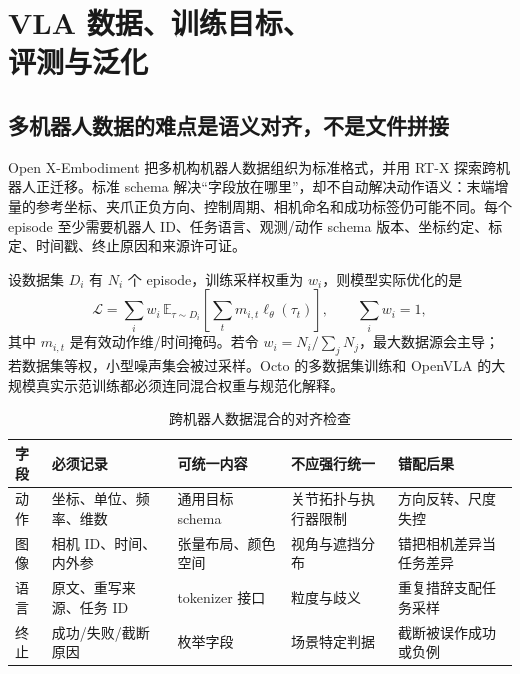 \chapter[VLA 数据、训练目标、评测与泛化]{VLA 数据、训练目标、\\评测与泛化}
\label{chap:vla-data-evaluation}

\section{多机器人数据的难点是语义对齐，不是文件拼接}

Open X-Embodiment 把多机构机器人数据组织为标准格式，并用 RT-X 探索跨机器人正迁移\cite{openx2024}。标准 schema 解决“字段放在哪里”，却不自动解决动作语义：末端增量的参考坐标、夹爪正负方向、控制周期、相机命名和成功标签仍可能不同。每个 episode 至少需要机器人 ID、任务语言、观测/动作 schema 版本、坐标约定、标定、时间戳、终止原因和来源许可证。

设数据集 $D_i$ 有 $N_i$ 个 episode，训练采样权重为 $w_i$，则模型实际优化的是
\begin{equation}
\mathcal L=\sum_i w_i\,\mathbb E_{\tau\sim D_i}
\left[\sum_t m_{i,t}\ell_\theta(\tau_t)\right],\qquad \sum_iw_i=1,
\label{eq:vla-mixture-loss}
\end{equation}
其中 $m_{i,t}$ 是有效动作维/时间掩码。若令 $w_i=N_i/\sum_jN_j$，最大数据源会主导；若数据集等权，小型噪声集会被过采样。Octo 的多数据集训练\cite{octo2024}和 OpenVLA 的大规模真实示范训练\cite{kim2024openvla}都必须连同混合权重与规范化解释。

\begin{table}[H]
\centering
\caption{跨机器人数据混合的对齐检查}
\label{tab:vla-data-alignment}
\begin{tabularx}{\textwidth}{p{}YYYY}
\toprule
字段 & 必须记录 & 可统一内容 & 不应强行统一 & 错配后果 \\
\midrule
动作 & 坐标、单位、频率、维数 & 通用目标 schema & 关节拓扑与执行器限制 & 方向反转、尺度失控 \\
图像 & 相机 ID、时间、内外参 & 张量布局、颜色空间 & 视角与遮挡分布 & 错把相机差异当任务差异 \\
语言 & 原文、重写来源、任务 ID & tokenizer 接口 & 粒度与歧义 & 重复措辞支配任务采样 \\
终止 & 成功/失败/截断原因 & 枚举字段 & 场景特定判据 & 截断被误作成功或负例 \\
\bottomrule
\end{tabularx}
\end{table}

